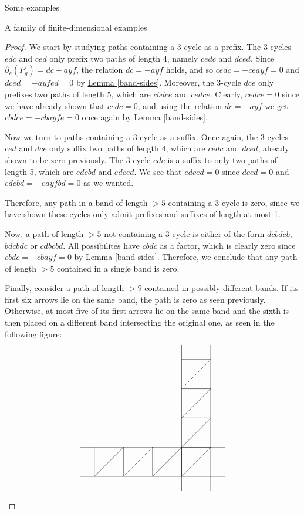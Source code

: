 \begin{chapter}{Some examples}
\begin{section}{A family of finite-dimensional examples}
\begin{proof}
We start by studying paths containing a $3$-cycle as a prefix. The $3$-cycles $edc$ and $ced$ only prefix two paths of length 4, namely $cedc$ and $dced$. Since $\partial_e(P_g) = dc + ayf$, the relation $dc = -ayf$ holds, and so $cedc=-ceayf=0$ and $dced=-ayfed=0$ by \hyperref[band-sides]{Lemma \ref*{band-sides}}. Moreover, the $3$-cycle $dce$ only prefixes two paths of length 5, which are $cbdce$ and $cedce$. Clearly, $cedce=0$ since we have already shown that $cedc=0$, and using the relation $dc=-ayf$ we get $cbdce = - cbayfe=0$ once again by \hyperref[band-sides]{Lemma \ref*{band-sides}}.

Now we turn to paths containing a $3$-cycle as a suffix. Once again, the $3$-cycles $ced$ and $dce$ only suffix two paths of length 4, which are $cedc$ and $dced$, already shown to be zero previously. The $3$-cycle $edc$ is a suffix to only two paths of length 5, which are $edcbd$ and $edced$. We see that $edced=0$ since $dced=0$ and $edcbd=-eayfbd=0$ as we wanted.

Therefore, any path in a band of length $>5$ containing a 3-cycle is zero, since we have shown these cycles only admit prefixes and suffixes of length at most 1.

Now, a path of length $>5$ not containing a 3-cycle is either of the form $dcbdcb$, $bdcbdc$ or $cdbcbd$. All possibilites have $cbdc$ as a factor, which is clearly zero since $cbdc = -cbayf = 0$ by \hyperref[band-sides]{Lemma \ref*{band-sides}}. Therefore, we conclude that any path of length $>5$ contained in a single band is zero.

Finally, consider a path of length $>9$ contained in possibly different bands. If its first six arrows lie on the same band, the path is zero as seen previously. Otherwise, at most five of its first arrows lie on the same band and the sixth is then placed on a different band intersecting the original one, as seen in the following figure:
\[
\begin{tikzpicture}
\draw (-3.5*1.25, 0) -- (1.5*1.25, 0);
\draw (-3.5*1.25, -1.25) -- (1.5*1.25, -1.25);
\draw (0,3.5*1.25) -- (0,-1.5*1.25);
\draw (1.25,3.5*1.25) -- (1.25,-1.5*1.25);

\foreach \x in {-3.75,-2.5,...,0}
{
\draw (\x,-1.25) -- (\x+1.25, 0);
\draw (0, -\x) -- (1.25, -\x);
\draw (\x,0) -- (\x, -1.25);
}

\foreach \x in {0,1.25,...,2.5}
\draw (0, \x) -- (1.25, \x+1.25);


\end{tikzpicture}\]
\end{proof}
\end{section}
\end{chapter}
